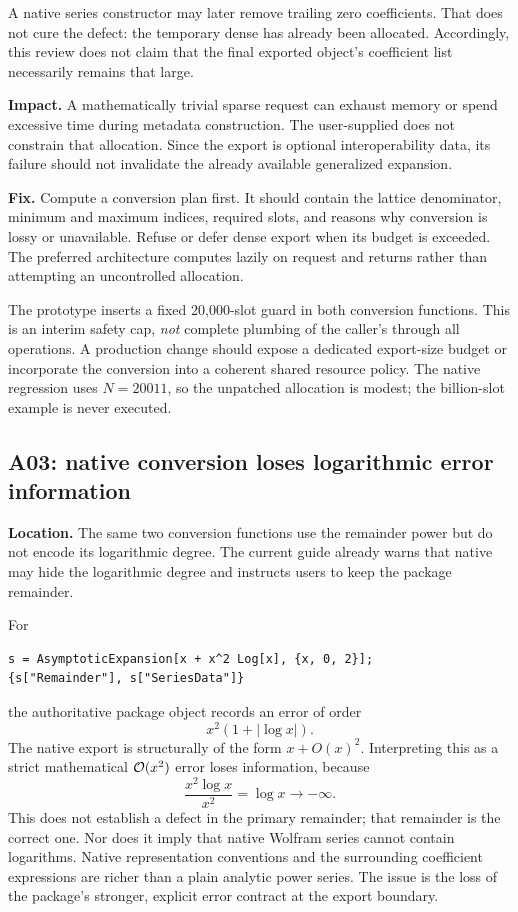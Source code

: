 A native series constructor may later remove trailing zero coefficients. That does not cure the defect: the temporary dense  has already been allocated. Accordingly, this review does not claim that the final exported object's coefficient list necessarily remains that large.

\textbf{Impact.} A mathematically trivial sparse request can exhaust memory or spend excessive time during metadata construction. The user-supplied  does not constrain that allocation. Since the export is optional interoperability data, its failure should not invalidate the already available generalized expansion.

\textbf{Fix.} Compute a conversion plan first. It should contain the lattice denominator, minimum and maximum indices, required slots, and reasons why conversion is lossy or unavailable. Refuse or defer dense export when its budget is exceeded. The preferred architecture computes  lazily on request and returns  rather than attempting an uncontrolled allocation.

The prototype inserts a fixed 20,000-slot guard in both conversion functions. This is an interim safety cap, \emph{not} complete plumbing of the caller's  through all operations. A production change should expose a dedicated export-size budget or incorporate the conversion into a coherent shared resource policy. The native regression uses $N=20011$, so the unpatched allocation is modest; the billion-slot example is never executed.

\subsection{A03: native conversion loses logarithmic error information}\label{sec:a03}

\textbf{Location.} The same two conversion functions use the remainder power but do not encode its logarithmic degree. The current guide already warns that native  may hide the logarithmic degree and instructs users to keep the package remainder.\cite{core,guide}

For
\begin{lstlisting}
s = AsymptoticExpansion[x + x^2 Log[x], {x, 0, 2}];
{s["Remainder"], s["SeriesData"]}
\end{lstlisting}
the authoritative package object records an error of order
\[
 x^2(1+|\log x|).
\]
The native export is structurally of the form $x+O(x)^2$. Interpreting this as a strict mathematical $\mathcal O(x^2)$ error loses information, because
\[
 \frac{x^2\log x}{x^2}=\log x\longrightarrow-\infty.
\]
This does not establish a defect in the primary  remainder; that remainder is the correct one. Nor does it imply that native Wolfram series cannot contain logarithms. Native representation conventions and the surrounding coefficient expressions are richer than a plain analytic power series. The issue is the loss of the package's stronger, explicit error contract at the export boundary.\cite{wl-seriesdata,wl-o}

